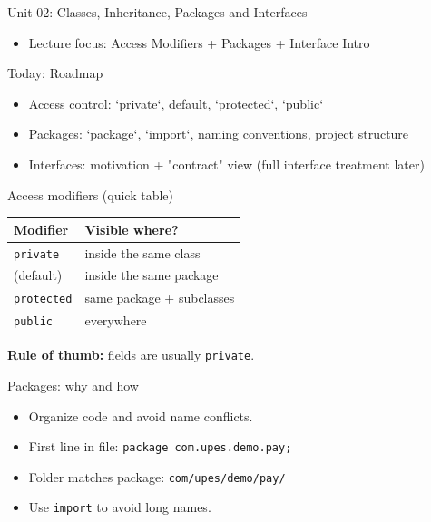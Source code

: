 \documentclass{beamer}
\begin{document}
\begin{frame}{Unit 02: Classes, Inheritance, Packages and Interfaces}
  \begin{itemize}[<+->]
    \item Lecture focus: Access Modifiers + Packages + Interface Intro
  \end{itemize}
  \slidesources{\OOPSUnitIISources}
\end{frame}

\begin{frame}{Today: Roadmap}
  \begin{itemize}[<+->]
    \item Access control: `private`, default, `protected`, `public`
    \item Packages: `package`, `import`, naming conventions, project structure
    \item Interfaces: motivation + "contract" view (full interface treatment later)
  \end{itemize}
  \slidesources{\OOPSUnitIISources}
\end{frame}

\begin{frame}{Access modifiers (quick table)}
  \begin{center}
  \begin{tabular}{ll}
    \toprule
    \textbf{Modifier} & \textbf{Visible where?} \\
    \midrule
    \texttt{private} & inside the same class \\
    (default) & inside the same package \\
    \texttt{protected} & same package + subclasses \\
    \texttt{public} & everywhere \\
    \bottomrule
  \end{tabular}
  \end{center}
  \vspace{0.3em}
  \textbf{Rule of thumb:} fields are usually \texttt{private}.
  \slidesources{\OOPSUnitIISources}
\end{frame}

\begin{frame}{Packages: why and how}
  \begin{itemize}[<+->]
    \item Organize code and avoid name conflicts.
    \item First line in file: \texttt{package com.upes.demo.pay;}
    \item Folder matches package: \texttt{com/upes/demo/pay/}
    \item Use \texttt{import} to avoid long names.
  \end{itemize}
  \slidesources{\OOPSUnitIISources}
\end{frame}
\end{document}
